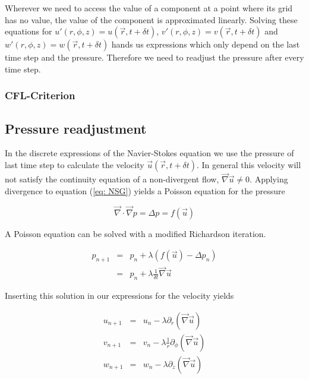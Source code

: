 \documentclass[12pt, a4paper, twoside]{article}
\begin{document}
		Wherever we need to access the value of a component at a point where its grid has no value, the value of the component is approximated linearly. Solving these equations for $u'(r,\phi,z) = u(\vec{r}, t+\delta t)$, $v'(r,\phi,z) = v(\vec{r}, t+\delta t)$ and $w'(r,\phi,z) = w(\vec{r}, t+\delta t)$ hands us expressions which only depend on the last time step and the pressure. Therefore we need to readjust the pressure after every time step.
		
		\subsubsection{CFL-Criterion}
		
	\subsection{Pressure readjustment}
		In the discrete expressions of the Navier-Stokes equation we use the pressure of last time step to calculate the velocity $\vec{u}(\vec{r},t+\delta t)$. In general this velocity will not satisfy the continuity equation of a non-divergent flow, $\vec{\nabla} \vec{u} \neq 0$. Applying divergence to equation (\ref{eq: NSG}) yields a Poisson equation for the pressure
		
		\begin{equation}
			\vec{\nabla} \cdot \vec{\nabla} p = \Delta p = f(\vec{u})
			\label{eq:Poisson Pressure}
		\end{equation}
		
		A Poisson equation can be solved with a modified Richardson iteration. %
		
		\begin{eqnarray}
			p_{n+1} &=& p_n + \lambda \left(f(\vec{u}) - \Delta p_n\right)
			\nonumber \\
			&=& p_n + \lambda \frac{1}{\delta t} \vec{\nabla}\vec{u}
			\label{eq:Drucknachregelung p}
		\end{eqnarray}
		
		Inserting this solution in our expressions for the velocity yields
		
		\begin{eqnarray}
			u_{n+1} &=& u_n - \lambda \partial_r (\vec{\nabla}\vec{u}) \\
			v_{n+1} &=& v_n - \lambda \frac{1}{r} \partial_\phi (\vec{\nabla}\vec{u}) \\
			w_{n+1} &=& w_n - \lambda \partial_z (\vec{\nabla}\vec{u})
			\label{eq:Drucknachregelung uvw}
		\end{eqnarray}
		
\end{document}
